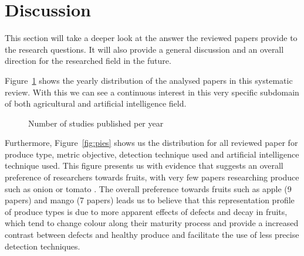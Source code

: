 \documentclass[conference]{IEEEtran}
\begin{document}
\section{Discussion}
\label{sec:disc}

This section will take a deeper look at the answer the reviewed papers provide to the research questions. It will also provide a general discussion and an overall direction for the researched field in the future.

Figure~\ref{fig:pubs} shows the yearly distribution of the analysed papers in this systematic review. With this we can see a continuous interest in this very specific subdomain of both agricultural and artificial intelligence field.

\begin{figure}[tb]
	\centering
	\caption{Number of studies published per year}
	\label{fig:pubs}
\end{figure}

Furthermore, Figure~\ref{fig:pies} shows us the distribution for all reviewed paper for produce type, metric objective, detection technique used and artificial intelligence technique used. This figure presents us with evidence that suggests an overall preference of researchers towards fruits, with very few papers researching produce such as onion \cite{Nipas2022} or tomato \cite{Bautista2020-ye} \cite{Shi2019}. The overall preference towards fruits such as apple (9 papers) and mango (7 papers) leads us to believe that this representation profile of produce types is due to more apparent effects of defects and decay in fruits, which tend to change colour along their maturity process and provide a increased contrast between defects and healthy produce and facilitate the use of less precise detection techniques.
\end{document}
